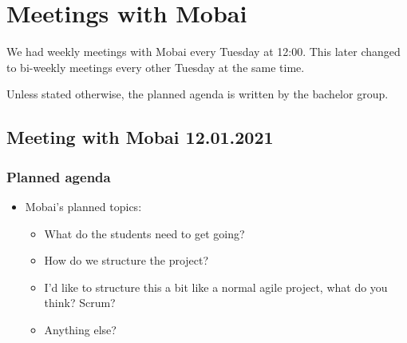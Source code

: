 \chapter{Meetings with Mobai}

We had weekly meetings with Mobai every Tuesday at 12:00. This later changed to bi-weekly meetings every other Tuesday at the same time.

Unless stated otherwise, the planned agenda is written by the bachelor group.

\section*{Meeting with Mobai 12.01.2021}
\subsection*{Planned agenda}
\begin{itemize}
    \item Mobai’s planned topics:
    \begin{itemize}
        \item What do the students need to get going?
        \item How do we structure the project?
        \item I’d like to structure this a bit like a normal agile project, what do you think? Scrum?
        \item Anything else?
    \end{itemize}
\end{itemize}

